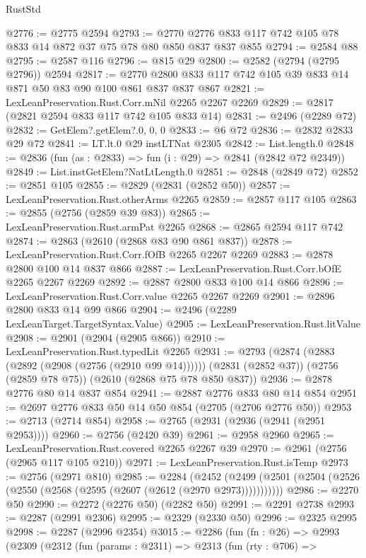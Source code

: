 \begin{lexlean}{RustStd}
\begin{coremodule}
@2776 := @2775 @2594
@2793 := @2770 @2776 @833 @117 @742 @105 @78 @833 @14 @872 @37 @75 @78 @80 @850 @837 @837 @855
@2794 := @2584 @88
@2795 := @2587 @116
@2796 := @815 @29
@2800 := @2582 (@2794 (@2795 @2796)) @2594
@2817 := @2770 @2800 @833 @117 @742 @105 @39 @833 @14 @871 @50 @83 @90 @100 @861 @837 @837 @867
@2821 := LexLeanPreservation.Rust.Corr.mNil @2265 @2267 @2269
@2829 := @2817 (@2821 @2594 @833 @117 @742 @105 @833 @14)
@2831 := @2496 (@2289 @72)
@2832 := GetElem?.getElem?.{0, 0, 0}
@2833 := @6 @72
@2836 := @2832 @2833 @29 @72
@2841 := LT.lt.{0} @29 instLTNat @2305
@2842 := List.length.{0}
@2848 := @2836 (fun (as : @2833) => fun (i : @29) => @2841 (@2842 @72 @2349))
@2849 := List.instGetElem?NatLtLength.{0}
@2851 := @2848 (@2849 @72)
@2852 := @2851 @105
@2855 := @2829 (@2831 (@2852 @50))
@2857 := LexLeanPreservation.Rust.otherArms @2265
@2859 := @2857 @117 @105
@2863 := @2855 (@2756 (@2859 @39 @83))
@2865 := LexLeanPreservation.Rust.armPat @2265
@2868 := @2865 @2594 @117 @742
@2874 := @2863 (@2610 (@2868 @83 @90 @861 @837))
@2878 := LexLeanPreservation.Rust.Corr.fOfB @2265 @2267 @2269
@2883 := @2878 @2800 @100 @14 @837 @866
@2887 := LexLeanPreservation.Rust.Corr.bOfE @2265 @2267 @2269
@2892 := @2887 @2800 @833 @100 @14 @866
@2896 := LexLeanPreservation.Rust.Corr.value @2265 @2267 @2269
@2901 := @2896 @2800 @833 @14 @99 @866
@2904 := @2496 (@2289 LexLeanTarget.TargetSyntax.Value)
@2905 := LexLeanPreservation.Rust.litValue
@2908 := @2901 (@2904 (@2905 @866))
@2910 := LexLeanPreservation.Rust.typedLit @2265
@2931 := @2793
    (@2874 (@2883 (@2892 (@2908 (@2756 (@2910 @99 @14))))))
    (@2831 (@2852 @37))
    (@2756 (@2859 @78 @75))
    (@2610 (@2868 @75 @78 @850 @837))
@2936 := @2878 @2776 @80 @14 @837 @854
@2941 := @2887 @2776 @833 @80 @14 @854
@2951 := @2697 @2776 @833 @50 @14 @50 @854 (@2705 (@2706 @2776 @50))
@2953 := @2713 (@2714 @854)
@2958 := @2765 (@2931 (@2936 (@2941 (@2951 @2953))))
@2960 := @2756 (@2420 @39)
@2961 := @2958 @2960
@2965 := LexLeanPreservation.Rust.covered @2265 @2267 @39
@2970 := @2961 (@2756 (@2965 @117 @105 @210))
@2971 := LexLeanPreservation.Rust.isTemp
@2973 := @2756 (@2971 @810)
@2985 := @2284
    (@2452 (@2499 (@2501 (@2504 (@2526 (@2550 (@2568 (@2595 (@2607 (@2612 (@2970 @2973)))))))))))
@2986 := @2270 @50
@2990 := @2272 (@2276 @50) (@2282 @50)
@2991 := @2291 @2738
@2993 := @2287 (@2991 @2306)
@2995 := @2329 (@2330 @50)
@2996 := @2325 @2995
@2998 := @2287 (@2996 @2354)
@3015 := @2286
    (fun (fn : @26) =>
    @2993
      (@2309
        (@2312
          (fun (params : @2311) =>
          @2313
            (fun (rty : @706) =>

\end{coremodule}
\end{lexlean}
